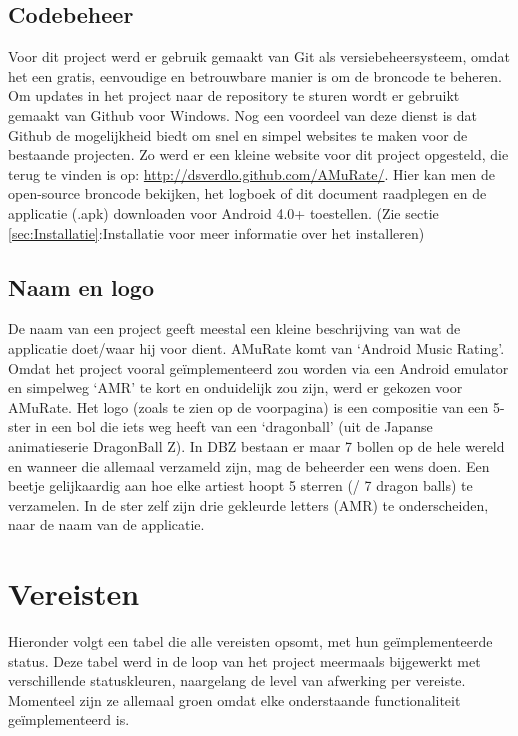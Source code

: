 \documentclass[11pt,a4paper]{article}
\begin{document}
	
	\subsection{Codebeheer}
	\label{sec:Codebeheer}
		Voor dit project werd er gebruik gemaakt van Git als versiebeheersysteem, omdat het een gratis, eenvoudige en betrouwbare manier is om de broncode te beheren. Om updates in het project naar de repository te sturen wordt er gebruikt gemaakt van Github voor Windows. Nog een voordeel van deze dienst is dat Github de mogelijkheid biedt om snel en simpel websites te maken voor de bestaande projecten. Zo werd er een kleine website voor dit project opgesteld, die terug te vinden is op: \url{http://dsverdlo.github.com/AMuRate/}. Hier kan men de open-source broncode bekijken, het logboek of dit document raadplegen en de applicatie (.apk) downloaden voor Android 4.0+ toestellen. (Zie sectie \ref{sec:Installatie}:Installatie voor meer informatie over het installeren)
		
	\subsection{Naam en logo}
	\label{sec:Naam en logo}
		De naam van een project geeft meestal een kleine beschrijving van wat de applicatie doet/waar hij voor dient. AMuRate komt van `Android Music Rating'. Omdat het project vooral geïmplementeerd zou worden via een Android emulator en simpelweg `AMR' te kort en onduidelijk zou zijn, werd er gekozen voor AMuRate. Het logo (zoals te zien op de voorpagina) is een compositie van een 5-ster in een bol die iets weg heeft van een `dragonball' (uit de Japanse animatieserie DragonBall Z). In DBZ bestaan er maar 7 bollen op de hele wereld en wanneer die allemaal verzameld zijn, mag de beheerder een wens doen. Een beetje gelijkaardig aan hoe elke artiest hoopt 5 sterren (/ 7 dragon balls) te verzamelen. 
	In de ster zelf zijn drie gekleurde letters (AMR) te onderscheiden, naar de naam van de applicatie.
	
	
\newpage %
\section{Vereisten}
\label{sec:Vereisten}
Hieronder volgt een tabel die alle vereisten opsomt, met hun geïmplementeerde status. Deze tabel werd in de loop van het project meermaals bijgewerkt met verschillende statuskleuren, naargelang de level van afwerking per vereiste. Momenteel zijn ze allemaal groen omdat elke onderstaande functionaliteit geïmplementeerd is. \\
\end{document}

